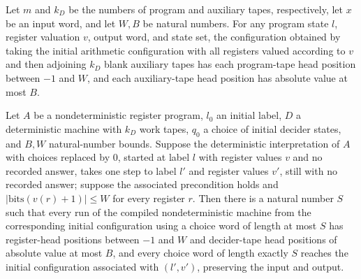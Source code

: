 \begin{lemma}
\label{Complexity.LogProg.nbox_seam}
\leanok
{}
Let $m$ and $k_D$ be the numbers of program and auxiliary tapes, respectively, let $x$
be an input word, and let $W,B$ be natural numbers. For any program state $l$, register
valuation $v$, output word, and state set, the configuration obtained by taking the
initial arithmetic configuration with all registers valued according to $v$ and then
adjoining $k_D$ blank auxiliary tapes has each program-tape head position between $-1$
and $W$, and each auxiliary-tape head position has absolute value at most $B$.
\end{lemma}

\begin{theorem}
\label{Complexity.LogProg.ndet_live}
\leanok
{}
Let $A$ be a nondeterministic register program, $l_0$ an initial label, $D$ a
deterministic machine with $k_D$ work tapes, $q_0$ a choice of initial decider states,
and $B,W$ natural-number bounds. Suppose the deterministic interpretation of $A$ with
choices replaced by $0$, started at label $l$ with register values $v$ and no recorded
answer, takes one step to label $l'$ and register values $v'$, still with no recorded
answer; suppose the associated precondition holds and $|\mathrm{bits}(v(r)+1)|\le W$ for
every register $r$. Then there is a natural number $S$ such that every run of the
compiled nondeterministic machine from the corresponding initial configuration using a
choice word of length at most $S$ has register-head positions between $-1$ and $W$ and
decider-tape head positions of absolute value at most $B$, and every choice word of
length exactly $S$ reaches the initial configuration associated with $(l',v')$,
preserving the input and output.
\end{theorem}

